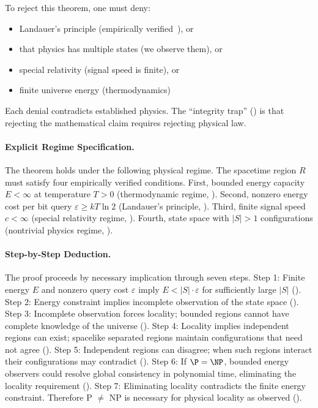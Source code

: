 To reject this theorem, one must deny:
\begin{itemize}
\item Landauer's principle (empirically verified~\cite{berut2012experimental}), or
\item that physics has multiple states (we observe them), or
\item special relativity (signal speed is finite), or
\item finite universe energy (thermodynamics)
\end{itemize}

Each denial contradicts established physics. The ``integrity trap'' () is that rejecting the mathematical claim requires rejecting physical law.

\paragraph{Explicit Regime Specification.}
The theorem holds under the following physical regime. The spacetime region $R$ must satisfy four empirically verified conditions. First, bounded energy capacity $E < \infty$ at temperature $T > 0$ (thermodynamic regime, ). Second, nonzero energy cost per bit query $\varepsilon \geq kT\ln 2$ (Landauer's principle, ). Third, finite signal speed $c < \infty$ (special relativity regime, ). Fourth, state space with $|S| > 1$ configurations (nontrivial physics regime, ).

\paragraph{Step-by-Step Deduction.}
The proof proceeds by necessary implication through seven steps. Step 1: Finite energy $E$ and nonzero query cost $\varepsilon$ imply $E < |S| \cdot \varepsilon$ for sufficiently large $|S|$ (). Step 2: Energy constraint implies incomplete observation of the state space (). Step 3: Incomplete observation forces locality; bounded regions cannot have complete knowledge of the universe (). Step 4: Locality implies independent regions can exist; spacelike separated regions maintain configurations that need not agree (). Step 5: Independent regions can disagree; when such regions interact their configurations may contradict (). Step 6: If $\P = \NP$, bounded energy observers could resolve global consistency in polynomial time, eliminating the locality requirement (). Step 7: Eliminating locality contradicts the finite energy constraint. Therefore P $\neq$ NP is necessary for physical locality as observed ().

